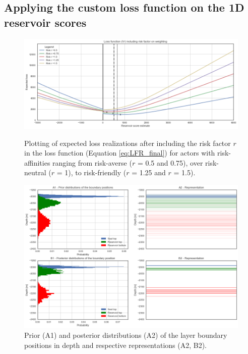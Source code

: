 			\subsection{Applying the custom loss function on the 1D reservoir scores}

			\begin{figure}[p!]
				\centering
				\includegraphics[width=1\textwidth]{Figures/LFR.png}
				\caption{Plotting of expected loss realizations after including the risk factor $r$ in the loss function (Equation \ref{eq:LFR_final}) for actors with risk-affinities ranging from risk-averse ($r$ = 0.5 and 0.75), over risk-neutral ($r$ = 1), to risk-friendly ($r$ = 1.25 and $r$ = 1.5).}\label{fig:1D_LFR} 
				\centering
				\includegraphics[width=1\textwidth]{Figures/update_moderate1.png}
				\caption{Prior (A1) and posterior distributions (A2) of the layer boundary positions in depth and respective representations (A2, B2).}\label{fig:update_moderate1} 
			\end{figure}
			
